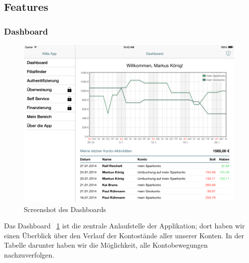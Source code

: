 \vspace{-24pt}
\subsection{Features}
\subsubsection{Dashboard}
\begin{figure}[h!]
	\centering
  	\includegraphics[height=0.25\textheight]{Pictures/Dashboard}
	\vspace{-12pt}	
	\caption{Screenshot des Dashboards}
	\label{fig1}
\end{figure}

Das Dashboard ~\ref{fig1} ist die zentrale Anlaufstelle der Applikation; dort haben wir einen Überblick über den Verlauf der Kontostände aller unserer Konten. In der Tabelle darunter haben wir die Möglichkeit, alle Kontobewegungen nachzuverfolgen.

